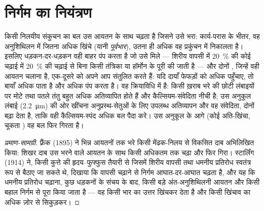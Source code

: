 \section{निर्गम का नियंत्रण}

\begin{theorem}[फ़्रैंक--स्टार्लिंग नियम]\label{thm:b2:heart:starling}
किसी निलयीय संकुचन का बल उस आयतन के साथ चढ़ता है जिसने उसे
भरा: कार्य-परास के भीतर, वह  अनुशिथिलन में जितना अधिक
खिंचे (यानी \emph{पूर्वभार}), उतना ही अधिक वह प्रकुंचन में
निकालता है। इसलिए  धड़कन-दर-धड़कन वही बाहर पंप करता है जो उसे
मिले --- शिरीय वापसी में \qty{20}{\%} की कोई चढ़ाई
 में \qty{20}{\%} की चढ़ाई से बिना किसी तंत्रिका या हॉर्मोन के पूरी की जाती है --- और
दोनों , जिन्हें वही आयतन चलाना है, एक-दूसरे को अपने आप
संतुलित करते हैं: यदि दायाँ  फेफड़ों को अधिक  पहुँचाए,
तो बायाँ  अधिक पाता है और अधिक पंप करता है। वह क्रियाविधि
 में है: किसी ख़राब भरे  की छोटी
लंबाइयों पर मोटे तथा पतले तंतु बहुत अधिक अतिव्यापित होते हैं और
कैल्सियम-संवेदिता नीची है; उस अनुकूल लंबाई
(\qty{2.2}{\micro m}) की ओर खींचना अनुप्रस्थ-सेतुओं के लिए उपलब्ध
अतिव्यापन और वह संवेदिता, दोनों बढ़ा देता है, ताकि वही कैल्सियम-स्पंद
अधिक बल पैदा करे। उस अनुकूल के आगे (कोई अति-खिंचा, चूकता
) वह बल फिर गिरता है।
\end{theorem}
\begin{proof}[प्रमाण-सामग्री]
फ़्रैंक (1895) ने भिन्न आयतनों तक भरे किसी मेंढक-निलय से विकसित
दाब अभिलिखित किया: शिखर दाब उस भरने वाले आयतन के साथ
किसी अधिकतम तक चढ़ा और फिर गिरा। स्टार्लिंग (1914) ने, किसी
कुत्ते की हृदय--फुफ्फुस तैयारी से जिसमें शिरीय वापसी तथा धमनीय
प्रतिरोध स्वतंत्र रूप से बैठाए जा सकते थे, दिखाया कि वापसी चढ़ाने से
निर्गम आघात-दर-आघात चढ़ता है, और यह कि धमनीय
प्रतिरोध चढ़ाना, कुछ धड़कनों के संचय के बाद, किसी
बड़े अंत-अनुशिथिलनी आयतन और किसी बहाल निर्गम से पूरा किया जाता है --- वह 
किसी भार का उत्तर खिंचकर देता है और किसी खिंचाव का अधिक ज़ोर से सिकुड़कर।
\end{proof}

